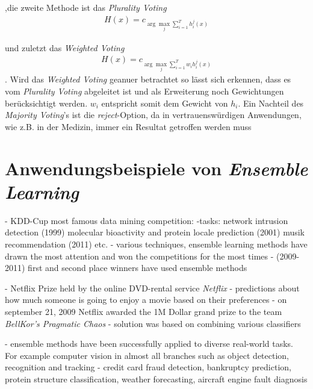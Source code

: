 ,die zweite Methode ist das \textit{Plurality Voting}
\begin{equation}
    \begin{gathered}
        H(x) = c_{\arg \max_{j}\sum_{i=1}^{T}h_{i}^{j}(x)}
    \end{gathered}
    \label{eq:pluralityVoting}
\end{equation}

und zuletzt das \textit{Weighted Voting}
\begin{equation}
    \begin{gathered}
        H(x) = c_{\arg \max_{j}\sum_{i=1}^{T}w_{i}h_{i}^{j}(x)}
    \end{gathered}
    \label{eq:weightedVoting}
\end{equation}
. Wird das \textit{Weighted Voting} geanuer betrachtet so lässt sich erkennen, dass es vom \textit{Plurality Voting} abgeleitet ist und als Erweiterung noch Gewichtungen berücksichtigt werden. $w_i$ entspricht somit dem Gewicht von $h_i$. Ein Nachteil des \textit{Majority Voting}'s ist die \textit{reject}-Option, da in vertrauenswürdigen Anwendungen, wie z.B. in der Medizin, immer ein Resultat getroffen werden muss \autocite[vgl. S.195]{Zhou.2021}

\section{Anwendungsbeispiele von \textit{Ensemble Learning}}
- KDD-Cup most famous data mining competition:
-tasks:
    network intrusion detection (1999)
    molecular bioactivity and protein locale prediction (2001)
    musik recommendation (2011)
    etc.
- various techniques, ensemble learning methods have drawn the most attention and won the competitions for the most times 
- (2009-2011) first and second place winners have used ensemble methods

- Netflix Prize held by the online DVD-rental service \textit{Netflix}
- predictions about how much someone is going to enjoy a movie based on their preferences
- on september 21, 2009 Netflix awarded the 1M Dollar grand prize to the team \textit{BellKor's Pragmatic Chaos}
- solution was based on combining various classifiers 

- ensemble methods have been successfully applied to diverse real-world tasks. For example computer vision in almost all branches such as object detection, recognition and tracking
- credit card fraud detection, bankruptcy prediction, protein structure classification, weather forecasting, aircraft engine fault diagnosis